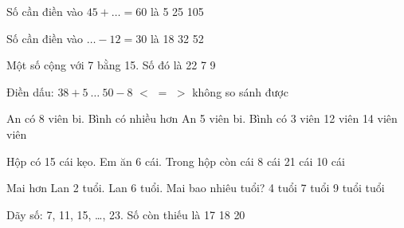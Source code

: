 \documentclass[../main.tex]{subfiles}
\begin{document}
\begin{ex}
  Số cần điền vào $45+\ldots=60$ là
  \choice
  {}
  {5}
  {25}
  {105}
\end{ex}

\begin{ex}
  Số cần điền vào $\ldots-12=30$ là
  \choice
  {18}
  {32}
  {}
  {52}
\end{ex}

\begin{ex}
  Một số cộng với 7 bằng 15. Số đó là
  \choice
  {22}
  {7}
  {}
  {9}
\end{ex}

\begin{ex}
  Điền dấu: $38+5\ \ldots\ 50-8$
  \choice
  {$<$}
  {$=$}
  {\True $>$}
  {không so sánh được}
\end{ex}

\begin{ex}
  An có 8 viên bi. Bình có nhiều hơn An 5 viên bi. Bình có
  \choice
  {3 viên}
  {12 viên}
  {14 viên}
  { viên}
\end{ex}

\begin{ex}
  Hộp có 15 cái kẹo. Em ăn 6 cái. Trong hộp còn
  \choice
  { cái}
  {8 cái}
  {21 cái}
  {10 cái}
\end{ex}

\begin{ex}
  Mai hơn Lan 2 tuổi. Lan 6 tuổi. Mai bao nhiêu tuổi?
  \choice
  {4 tuổi}
  {7 tuổi}
  {9 tuổi}
  { tuổi}
\end{ex}

\begin{ex}
  Dãy số: 7, 11, 15, \ldots, 23. Số còn thiếu là
  \choice
  {17}
  {18}
  {}
  {20}
\end{ex}
\end{document}
